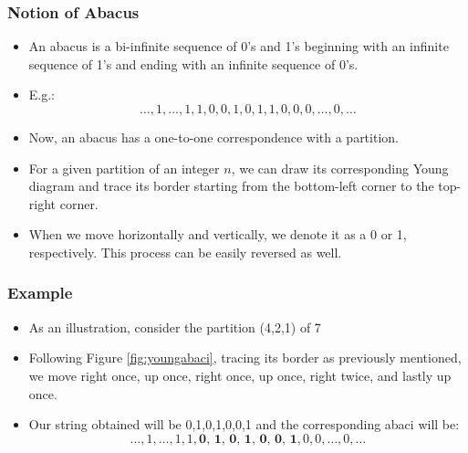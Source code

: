 \documentclass{beamer}
\begin{document}
\begin{frame}
\frametitle{Notion of Abacus}
\begin{itemize}
    \item An abacus is a bi-infinite sequence of 0’s and 1’s beginning with an infinite sequence of 1’s and ending with an infinite sequence of 0’s. 
    \item E.g.: \[ \ldots, 1, \ldots, 1, 1, 0, 0, 1, 0, 1, 1, 0, 0, 0, \ldots, 0, \ldots \]
    \item Now, an abacus has a one-to-one correspondence with a partition. 
    \item For a given partition of an integer $n$, we can draw its corresponding Young diagram and trace its border starting from the bottom-left corner to the top-right corner. 
    \item When we move horizontally and vertically, we denote it as a 0 or 1, respectively. This process can be easily reversed as well. 
\end{itemize}
\end{frame}


\begin{frame}
\frametitle{Example}
\begin{itemize}
    \item As an illustration, consider the partition (4,2,1) of 7
    \item Following Figure \ref{fig:youngabaci}, tracing its border as previously mentioned, we move right once, up once, right once, up once, right twice, and lastly up once. 
    \item Our string obtained will be 0,1,0,1,0,0,1 and the corresponding abaci will be: \[ \ldots, 1, \ldots, 1, 1, \textbf{0, 1, 0, 1, 0, 0, 1}, 0, 0, \ldots, 0, \ldots \]
\end{itemize}
\centering
{}
\label{fig:youngabaci}
\end{frame}
\end{document}
